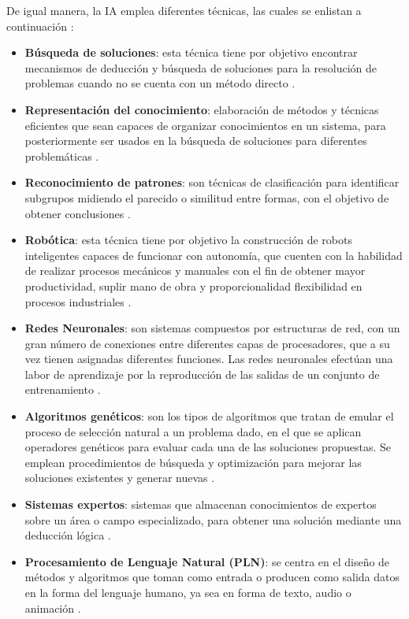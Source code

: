 De igual manera, la IA emplea diferentes técnicas, las cuales se enlistan a continuación \cite{ref43}:

\begin{itemize}
    \item \textbf{Búsqueda de soluciones}: esta técnica tiene por objetivo encontrar mecanismos de deducción y búsqueda de soluciones para la resolución de problemas cuando no se cuenta con un método directo \cite{ref43}.\\
    \item \textbf{Representación del conocimiento}: elaboración de métodos y técnicas eficientes que sean capaces de organizar conocimientos en un sistema, para posteriormente ser usados en la búsqueda de soluciones para diferentes problemáticas \cite{ref43}.\\
    \item \textbf{Reconocimiento de patrones}: son técnicas de clasificación para identificar subgrupos midiendo el parecido o similitud entre formas, con el objetivo de obtener conclusiones \cite{ref43}.\\
    \item \textbf{Robótica}: esta técnica tiene por objetivo la construcción de robots inteligentes capaces de funcionar con autonomía, que cuenten con la habilidad de realizar procesos mecánicos y manuales con el fin de obtener mayor productividad, suplir mano de obra y proporcionalidad flexibilidad en procesos industriales \cite{ref43}.\\
    \item \textbf{Redes Neuronales}: son sistemas compuestos por estructuras de red, con un gran número de conexiones entre diferentes capas de procesadores, que a su vez tienen asignadas diferentes funciones. Las redes neuronales efectúan una labor de aprendizaje por la reproducción de las salidas de un conjunto de entrenamiento \cite{ref43}.\\
    \item \textbf{Algoritmos genéticos}: son los tipos de algoritmos que tratan de emular el proceso de selección natural a un problema dado, en el que se aplican operadores genéticos para evaluar cada una de las soluciones propuestas. Se emplean procedimientos de búsqueda y optimización para mejorar las soluciones existentes y generar nuevas \cite{ref43}.\\
    \item \textbf{Sistemas expertos}: sistemas que almacenan conocimientos de expertos sobre un área o campo especializado, para obtener una solución mediante una deducción lógica \cite{ref43}. \\
    \item \textbf{Procesamiento de Lenguaje Natural (PLN)}: se centra en el diseño de métodos y algoritmos que toman como entrada o producen como salida datos en la forma del lenguaje humano, ya sea en forma de texto, audio o animación \cite{ref44}.
\end{itemize}

